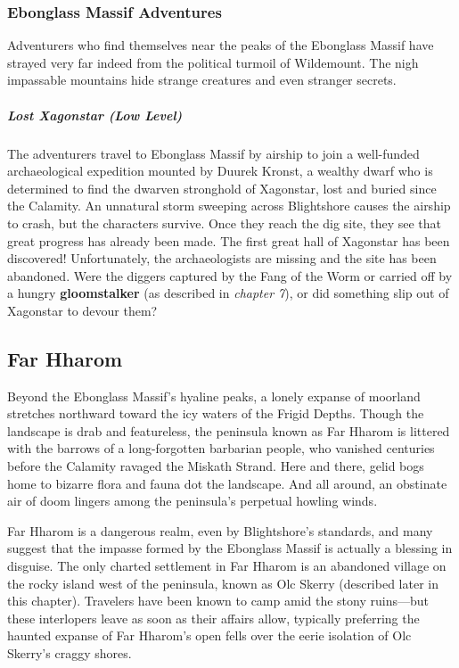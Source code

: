 \documentclass[10pt,a4paper,twoside,bg=print,twocolumn,openany,nodeprecatedcode]{dndbook}
\begin{document}
\subsubsection{Ebonglass Massif Adventures}
Adventurers who find themselves near the peaks of the Ebonglass Massif have strayed very far indeed from the political turmoil of Wildemount. The nigh impassable mountains hide strange creatures and even stranger secrets.

\subparagraph{Lost Xagonstar (Low Level)}
The adventurers travel to Ebonglass Massif by airship to join a well-funded archaeological expedition mounted by Duurek Kronst, a wealthy dwarf who is determined to find the dwarven stronghold of Xagonstar, lost and buried since the Calamity. An unnatural storm sweeping across Blightshore causes the airship to crash, but the characters survive. Once they reach the dig site, they see that great progress has already been made. The first great hall of Xagonstar has been discovered! Unfortunately, the archaeologists are missing and the site has been abandoned. Were the diggers captured by the Fang of the Worm or carried off by a hungry \textbf{gloomstalker} (as described in \textit{chapter 7}), or did something slip out of Xagonstar to devour them?

\subsection{Far Hharom}
Beyond the Ebonglass Massif's hyaline peaks, a lonely expanse of moorland stretches northward toward the icy waters of the Frigid Depths. Though the landscape is drab and featureless, the peninsula known as Far Hharom is littered with the barrows of a long-forgotten barbarian people, who vanished centuries before the Calamity ravaged the Miskath Strand. Here and there, gelid bogs home to bizarre flora and fauna dot the landscape. And all around, an obstinate air of doom lingers among the peninsula's perpetual howling winds.

Far Hharom is a dangerous realm, even by Blightshore's standards, and many suggest that the impasse formed by the Ebonglass Massif is actually a blessing in disguise. The only charted settlement in Far Hharom is an abandoned village on the rocky island west of the peninsula, known as Olc Skerry (described later in this chapter). Travelers have been known to camp amid the stony ruins—but these interlopers leave as soon as their affairs allow, typically preferring the haunted expanse of Far Hharom's open fells over the eerie isolation of Olc Skerry's craggy shores.
\end{document}
